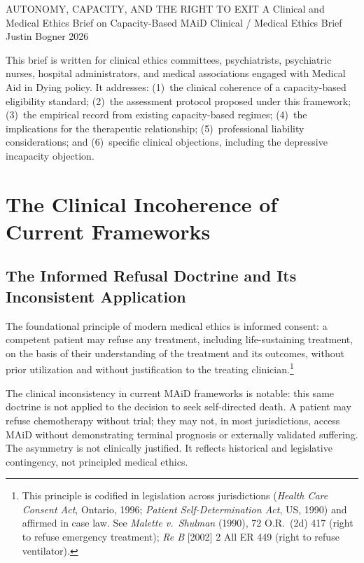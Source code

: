 \documentclass[11pt, letterpaper]{article}
\begin{document}
\campaigntitle%
  {AUTONOMY, CAPACITY, AND THE RIGHT TO EXIT}%
  {A Clinical and Medical Ethics Brief on Capacity-Based MAiD}%
  {Clinical / Medical Ethics Brief}%
  {Justin Bogner}%
  {2026}

\suitenote

\begin{policybox}[title={\sffamily\bfseries\small\color{C@accent}
  Purpose and Audience}]
This brief is written for clinical ethics committees, psychiatrists, psychiatric
nurses, hospital administrators, and medical associations engaged with Medical Aid in
Dying policy. It addresses: (1)~the clinical coherence of a capacity-based eligibility
standard; (2)~the assessment protocol proposed under this framework; (3)~the empirical
record from existing capacity-based regimes; (4)~the implications for the therapeutic
relationship; (5)~professional liability considerations; and (6)~specific clinical
objections, including the depressive incapacity objection.
\end{policybox}

\bigskip

\section{The Clinical Incoherence of Current Frameworks}

\subsection{The Informed Refusal Doctrine and Its Inconsistent Application}

The foundational principle of modern medical ethics is informed consent: a competent
patient may refuse any treatment, including life-sustaining treatment, on the basis of
their understanding of the treatment and its outcomes, without prior utilization and
without justification to the treating clinician.\footnote{%
  This principle is codified in legislation across jurisdictions (\textit{Health Care
  Consent Act}, Ontario, 1996; \textit{Patient Self-Determination Act}, US, 1990) and
  affirmed in case law. See \textit{Malette v.\ Shulman} (1990), 72 O.R.\ (2d) 417
  (right to refuse emergency treatment); \textit{Re B} [2002] 2 All ER 449 (right to
  refuse ventilator).}

The clinical inconsistency in current MAiD frameworks is notable: this same doctrine is
not applied to the decision to seek self-directed death. A patient may refuse
chemotherapy without trial; they may not, in most jurisdictions, access MAiD without
demonstrating terminal prognosis or externally validated suffering. The asymmetry is
not clinically justified. It reflects historical and legislative contingency, not
principled medical ethics.
\end{document}
